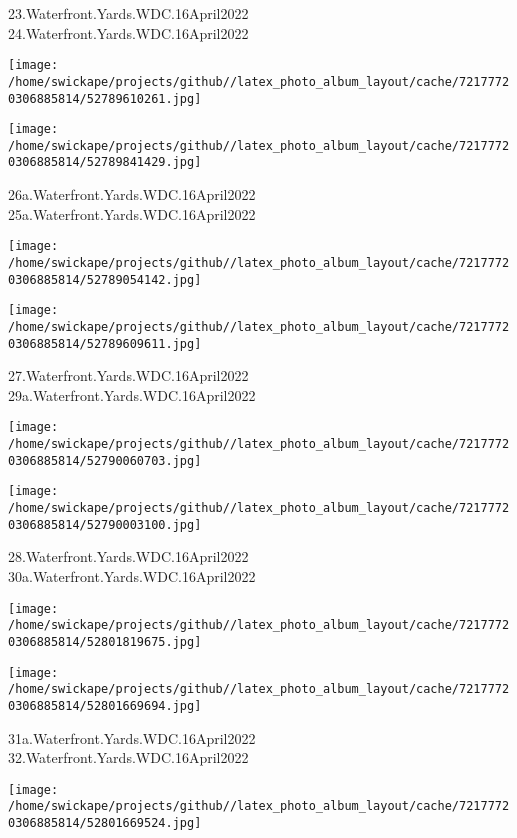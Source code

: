 \documentclass[10pt,letterpaper]{article}
\begin{document}
23.Waterfront.Yards.WDC.16April2022\\
24.Waterfront.Yards.WDC.16April2022
\pagebreak

\texttt{[image: /home/swickape/projects/github//latex\_photo\_album\_layout/cache/72177720306885814/52789610261.jpg]}

\vspace{0.25in}
\texttt{[image: /home/swickape/projects/github//latex\_photo\_album\_layout/cache/72177720306885814/52789841429.jpg]}

26a.Waterfront.Yards.WDC.16April2022\\
25a.Waterfront.Yards.WDC.16April2022
\pagebreak

\texttt{[image: /home/swickape/projects/github//latex\_photo\_album\_layout/cache/72177720306885814/52789054142.jpg]}

\vspace{0.25in}
\texttt{[image: /home/swickape/projects/github//latex\_photo\_album\_layout/cache/72177720306885814/52789609611.jpg]}

27.Waterfront.Yards.WDC.16April2022\\
29a.Waterfront.Yards.WDC.16April2022
\pagebreak

\texttt{[image: /home/swickape/projects/github//latex\_photo\_album\_layout/cache/72177720306885814/52790060703.jpg]}

\vspace{0.25in}
\texttt{[image: /home/swickape/projects/github//latex\_photo\_album\_layout/cache/72177720306885814/52790003100.jpg]}

28.Waterfront.Yards.WDC.16April2022\\
30a.Waterfront.Yards.WDC.16April2022
\pagebreak

\texttt{[image: /home/swickape/projects/github//latex\_photo\_album\_layout/cache/72177720306885814/52801819675.jpg]}

\vspace{0.25in}
\texttt{[image: /home/swickape/projects/github//latex\_photo\_album\_layout/cache/72177720306885814/52801669694.jpg]}

31a.Waterfront.Yards.WDC.16April2022\\
32.Waterfront.Yards.WDC.16April2022
\pagebreak

\texttt{[image: /home/swickape/projects/github//latex\_photo\_album\_layout/cache/72177720306885814/52801669524.jpg]}
\end{document}
